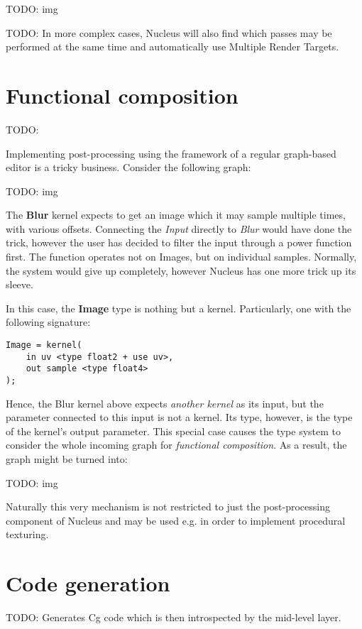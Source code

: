TODO: img

TODO: In more complex cases, Nucleus will also find which passes may be performed at the same time and automatically use Multiple Render Targets.

\section{Functional composition}

TODO: 


Implementing post-processing using the framework of a regular graph-based editor is a tricky business. Consider the following graph:

TODO: img

The \textbf{Blur} kernel expects to get an image which it may sample multiple times, with various offsets. Connecting the \emph{Input} directly to \emph{Blur} would have done the trick, however the user has decided to filter the input through a power function first. The function operates not on Images, but on individual samples. Normally, the system would give up completely, however Nucleus has one more trick up its sleeve.

In this case, the \textbf{Image} type is nothing but a kernel. Particularly, one with the following signature:
	
\begin{lstlisting}[frame=single]
Image = kernel(
    in uv <type float2 + use uv>,
    out sample <type float4>
);
\end{lstlisting}

Hence, the Blur kernel above expects \emph{another kernel} as its input, but the parameter connected to this input is not a kernel. Its type, however, is the type of the kernel's output parameter. This special case causes the type system to consider the whole incoming graph for \emph{functional composition}. As a result, the graph might be turned into:

TODO: img

Naturally this very mechanism is not restricted to just the post-processing component of Nucleus and may be used e.g. in order to implement procedural texturing.
	
\section{Code generation}

TODO: Generates Cg code which is then introspected by the mid-level layer.
